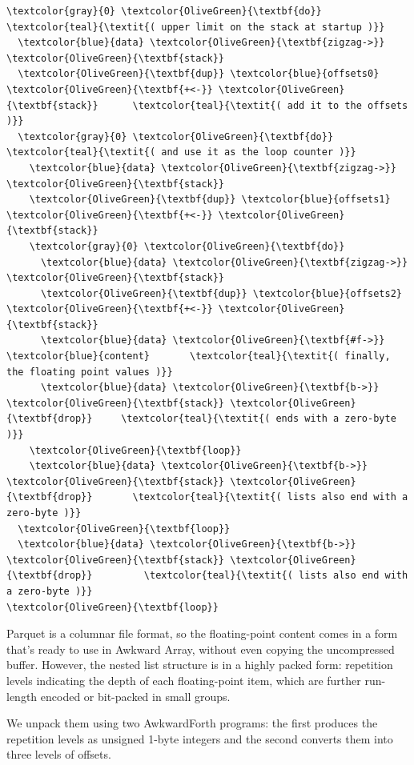 \documentclass{webofc}
\begin{document}
\begin{Verbatim}[commandchars=\\\{\}]
\textcolor{gray}{0} \textcolor{OliveGreen}{\textbf{do}}                          \textcolor{teal}{\textit{( upper limit on the stack at startup )}}
  \textcolor{blue}{data} \textcolor{OliveGreen}{\textbf{zigzag->}} \textcolor{OliveGreen}{\textbf{stack}}
  \textcolor{OliveGreen}{\textbf{dup}} \textcolor{blue}{offsets0} \textcolor{OliveGreen}{\textbf{+<-}} \textcolor{OliveGreen}{\textbf{stack}}      \textcolor{teal}{\textit{( add it to the offsets )}}
  \textcolor{gray}{0} \textcolor{OliveGreen}{\textbf{do}}                        \textcolor{teal}{\textit{( and use it as the loop counter )}}
    \textcolor{blue}{data} \textcolor{OliveGreen}{\textbf{zigzag->}} \textcolor{OliveGreen}{\textbf{stack}}
    \textcolor{OliveGreen}{\textbf{dup}} \textcolor{blue}{offsets1} \textcolor{OliveGreen}{\textbf{+<-}} \textcolor{OliveGreen}{\textbf{stack}}
    \textcolor{gray}{0} \textcolor{OliveGreen}{\textbf{do}}
      \textcolor{blue}{data} \textcolor{OliveGreen}{\textbf{zigzag->}} \textcolor{OliveGreen}{\textbf{stack}}
      \textcolor{OliveGreen}{\textbf{dup}} \textcolor{blue}{offsets2} \textcolor{OliveGreen}{\textbf{+<-}} \textcolor{OliveGreen}{\textbf{stack}}
      \textcolor{blue}{data} \textcolor{OliveGreen}{\textbf{#f->}} \textcolor{blue}{content}       \textcolor{teal}{\textit{( finally, the floating point values )}}
      \textcolor{blue}{data} \textcolor{OliveGreen}{\textbf{b->}} \textcolor{OliveGreen}{\textbf{stack}} \textcolor{OliveGreen}{\textbf{drop}}     \textcolor{teal}{\textit{( ends with a zero-byte )}}
    \textcolor{OliveGreen}{\textbf{loop}}
    \textcolor{blue}{data} \textcolor{OliveGreen}{\textbf{b->}} \textcolor{OliveGreen}{\textbf{stack}} \textcolor{OliveGreen}{\textbf{drop}}       \textcolor{teal}{\textit{( lists also end with a zero-byte )}}
  \textcolor{OliveGreen}{\textbf{loop}}
  \textcolor{blue}{data} \textcolor{OliveGreen}{\textbf{b->}} \textcolor{OliveGreen}{\textbf{stack}} \textcolor{OliveGreen}{\textbf{drop}}         \textcolor{teal}{\textit{( lists also end with a zero-byte )}}
\textcolor{OliveGreen}{\textbf{loop}}
\end{Verbatim}

\noindent Parquet is a columnar file format, so the floating-point content comes in a form that's ready to use in Awkward Array, without even copying the uncompressed buffer. However, the nested list structure is in a highly packed form: repetition levels indicating the depth of each floating-point item, which are further run-length encoded or bit-packed in small groups.

We unpack them using two AwkwardForth programs: the first produces the repetition levels as unsigned 1-byte integers and the second converts them into three levels of offsets.
\end{document}
